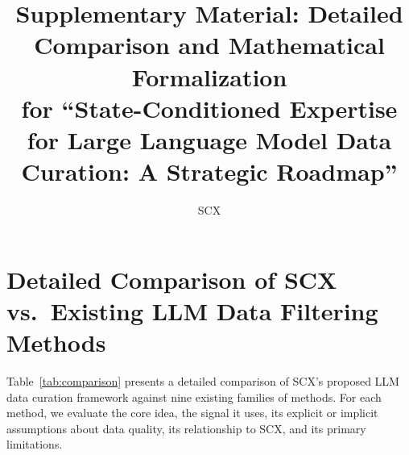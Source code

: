 \documentclass[11pt]{article}
\title{Supplementary Material: Detailed Comparison and Mathematical Formalization\\
       \large for ``State-Conditioned Expertise for Large Language Model Data Curation: A Strategic Roadmap''}
\author{SCX}
\begin{document}
\maketitle

\tableofcontents

\newpage

\section{Detailed Comparison of SCX vs.\ Existing LLM Data Filtering Methods}

Table~\ref{tab:comparison} presents a detailed comparison of SCX's proposed LLM data curation framework against nine existing families of methods. For each method, we evaluate the core idea, the signal it uses, its explicit or implicit assumptions about data quality, its relationship to SCX, and its primary limitations.
\end{document}
